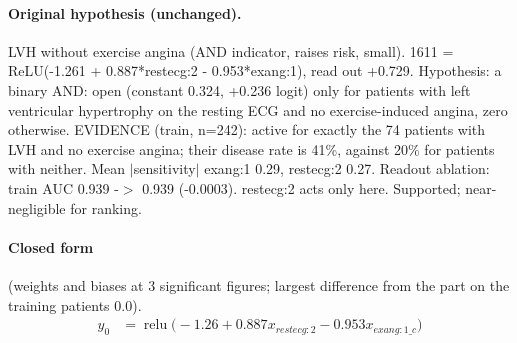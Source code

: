 \documentclass[a4paper,10pt]{article}
\newif\ifreviewmarks
\newcommand{\reviewrule}{\noindent{\color{BrickRed}\rule{\linewidth}{0.8pt}}}
\newenvironment{drafted}[1][]{%
  \ifreviewmarks\par\addvspace{\medskipamount}\reviewrule\par\nopagebreak
  \noindent{\color{BrickRed}\sffamily\footnotesize\textbf{Thesis Draft}\quad #1\hfill review}\par\nopagebreak\smallskip\fi}{%
  \ifreviewmarks\par\smallskip\noindent{\color{BrickRed}\sffamily\footnotesize end of thesis draft}\par\nopagebreak\reviewrule\par\medskip\fi}
\begin{document}
\begin{drafted}[plain-language layer: heart-s5-c2]
\paragraph{Original hypothesis (unchanged).} LVH without exercise angina (AND indicator, raises risk, small). 1611 = ReLU(-1.261 + 0.887*restecg:2 - 0.953*exang:1), read out +0.729. Hypothesis: a binary AND: open (constant 0.324, +0.236 logit) only for patients with left ventricular hypertrophy on the resting ECG and no exercise-induced angina, zero otherwise. EVIDENCE (train, n=242): active for exactly the 74 patients with LVH and no exercise angina; their disease rate is 41\%, against 20\% for patients with neither. Mean $|$sensitivity$|$ exang:1 0.29, restecg:2 0.27. Readout ablation: train AUC 0.939 -$>$ 0.939 (-0.0003). restecg:2 acts only here. Supported; near-negligible for ranking.
\paragraph{Closed form} {\footnotesize(weights and biases at 3 significant figures; largest difference from the part on the training patients 0.0).}
{\small\begingroup\allowdisplaybreaks
\begin{align*}
y_{0} &= \operatorname{relu}\bigl(-1.26 + 0.887 x_{restecg:2} - 0.953 x_{exang:1\_c}\bigr)
\end{align*}\endgroup}


\end{drafted}
\end{document}
